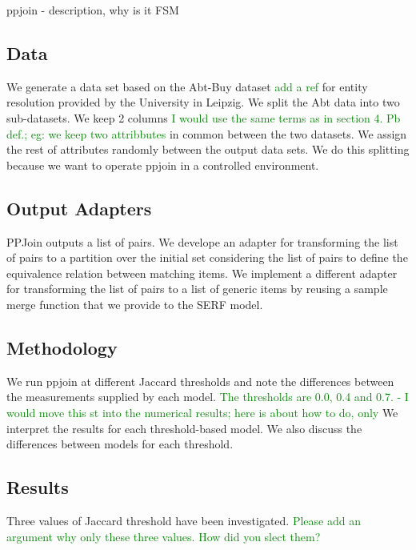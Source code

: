 \documentclass[11pt]{article}
\begin{document}
    ppjoin - description, why is it FSM

    \subsection[data]{Data}\label{subsec:data}
    
    We generate a data set based on the Abt-Buy dataset 
    \textcolor{green}{add a ref} 
    for entity resolution provided by the University in Leipzig. We split the Abt data into two sub-datasets. We keep 2 columns
    \textcolor{green}{I would use the same terms as in section 4. Pb def.; eg: we keep two attribbutes} 
    in common between the two datasets. We assign the rest of attributes randomly between the output data sets. We do this splitting because we want to operate ppjoin in a controlled environment.

    \subsection[adapters]{Output Adapters}\label{subsec:adapters}

    PPJoin outputs a list of pairs. We develope an adapter for transforming the list of pairs to a partition over the initial set considering the list of pairs to define the equivalence relation between matching items. We implement a different adapter for transforming the list of pairs to a list of generic items by reusing a sample merge function that we provide to the SERF model.

    \subsection[method]{Methodology}\label{subsec:methodology}

    We run ppjoin at different Jaccard thresholds and note the differences between the measurements supplied by each model. 
    \textcolor{green}{The thresholds are 0.0, 0.4 and 0.7. - I would move this st into the numerical results; here is about how to do, only}     
    We interpret the results for each threshold-based model. We also discuss the differences between models for each threshold.

    \subsection[results]{Results}\label{subsec:results}

    Three values of Jaccard threshold have been investigated.
    \textcolor{green}{Please add an argument why only these three values. How did you slect them?} 
\end{document}
